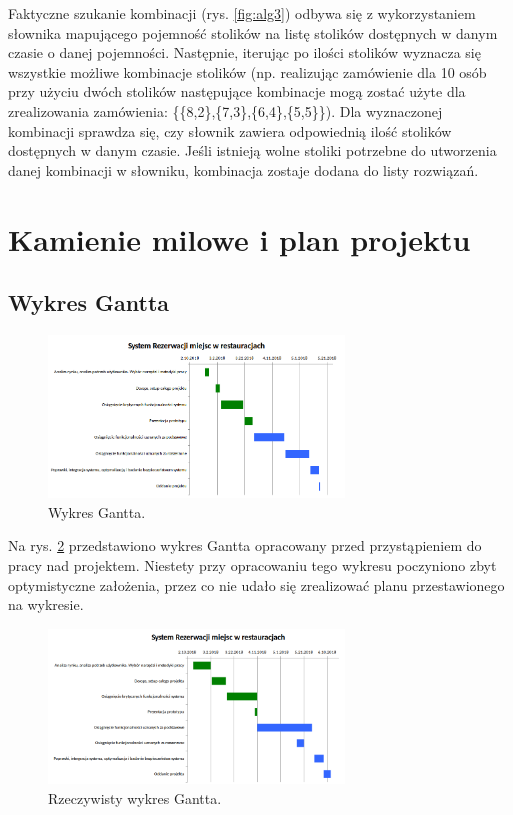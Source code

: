 \documentclass{article}
\begin{document}
Faktyczne szukanie kombinacji (rys. \ref{fig:alg3}) odbywa się z wykorzystaniem słownika mapującego pojemność stolików na listę stolików dostępnych w danym czasie o danej pojemności. Następnie, iterując po ilości stolików wyznacza się wszystkie możliwe kombinacje stolików (np. realizując zamówienie dla 10 osób przy użyciu dwóch stolików następujące kombinacje mogą zostać użyte dla zrealizowania zamówienia: \{\{8,2\},\{7,3\},\{6,4\},\{5,5\}\}). Dla wyznaczonej kombinacji sprawdza się, czy słownik zawiera odpowiednią ilość stolików dostępnych w danym czasie. Jeśli istnieją wolne stoliki potrzebne do utworzenia danej kombinacji w słowniku, kombinacja zostaje dodana do listy rozwiązań.

\section{Kamienie milowe i plan projektu}
\subsection{Wykres Gantta}

\begin{figure}[h]
\centering
	\includegraphics[width=0.70\textwidth]{gantt.png}
	\caption[caption]{Wykres Gantta.}
	\label{fig:gantt}
\end{figure}

Na rys. \ref{fig:gantt} przedstawiono wykres Gantta opracowany przed przystąpieniem do pracy nad projektem. Niestety przy opracowaniu tego wykresu poczyniono zbyt optymistyczne założenia, przez co nie udało się zrealizować planu przestawionego na wykresie.

\begin{figure}[h]
\centering
	\includegraphics[width=0.70\textwidth]{gantt_real.png}
	\caption[caption]{Rzeczywisty wykres Gantta.}
	\label{fig:gantt}
\end{figure}
\end{document}
